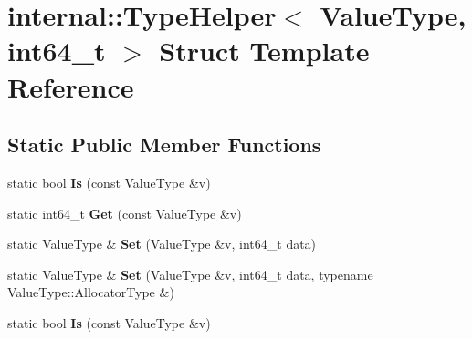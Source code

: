\hypertarget{structinternal_1_1_type_helper_3_01_value_type_00_01int64__t_01_4}{}\section{internal\+:\+:Type\+Helper$<$ Value\+Type, int64\+\_\+t $>$ Struct Template Reference}
\label{structinternal_1_1_type_helper_3_01_value_type_00_01int64__t_01_4}
\subsection*{Static Public Member Functions}
\begin{DoxyCompactItemize}
\item 
static bool {\bfseries Is} (const Value\+Type \&v)\hypertarget{structinternal_1_1_type_helper_3_01_value_type_00_01int64__t_01_4_a43c171bfbe873941a1b2be698a95de74}{}\label{structinternal_1_1_type_helper_3_01_value_type_00_01int64__t_01_4_a43c171bfbe873941a1b2be698a95de74}

\item 
static int64\+\_\+t {\bfseries Get} (const Value\+Type \&v)\hypertarget{structinternal_1_1_type_helper_3_01_value_type_00_01int64__t_01_4_abe3368c8817cafe420a8b3f7d6ec1759}{}\label{structinternal_1_1_type_helper_3_01_value_type_00_01int64__t_01_4_abe3368c8817cafe420a8b3f7d6ec1759}

\item 
static Value\+Type \& {\bfseries Set} (Value\+Type \&v, int64\+\_\+t data)\hypertarget{structinternal_1_1_type_helper_3_01_value_type_00_01int64__t_01_4_a0c7b71569c12346902a396111782b12b}{}\label{structinternal_1_1_type_helper_3_01_value_type_00_01int64__t_01_4_a0c7b71569c12346902a396111782b12b}

\item 
static Value\+Type \& {\bfseries Set} (Value\+Type \&v, int64\+\_\+t data, typename Value\+Type\+::\+Allocator\+Type \&)\hypertarget{structinternal_1_1_type_helper_3_01_value_type_00_01int64__t_01_4_a85471fa774b4a8f4f56c191694a7f278}{}\label{structinternal_1_1_type_helper_3_01_value_type_00_01int64__t_01_4_a85471fa774b4a8f4f56c191694a7f278}

\item 
static bool {\bfseries Is} (const Value\+Type \&v)\hypertarget{structinternal_1_1_type_helper_3_01_value_type_00_01int64__t_01_4_a43c171bfbe873941a1b2be698a95de74}{}\label{structinternal_1_1_type_helper_3_01_value_type_00_01int64__t_01_4_a43c171bfbe873941a1b2be698a95de74}


\end{DoxyCompactItemize}
